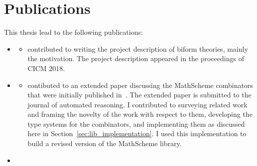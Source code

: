 \section{Publications}
This thesis lead to the following publications: 
\begin{itemize}
    \item \cite{biformCICM2018} 
        \begin{itemize}
        \item[] contributed to writing the project description of biform theories, mainly the motivation. The project description appeared in the proceedings of CICM 2018. 
        \end{itemize}
    \item \cite{carette2018building} 
    \begin{itemize} 
    \item[] contibuted to an extended paper discussing the MathScheme combinators that were initially published in~\cite{CaretteOConnorTPC}. The extended paper is submitted to the journal of automated reasoning. I contributed to surveying related work and framing the novelty of the work with respect to them, developing the type systems for the combinators, and implementing them as discussed here in Section~\ref{sec:lib_implementation}. I used this implementation to build a revised version of the MathScheme library. 
   \end{itemize}
    \item ~\cite{diagrams_mmt} 

\end{itemize}
